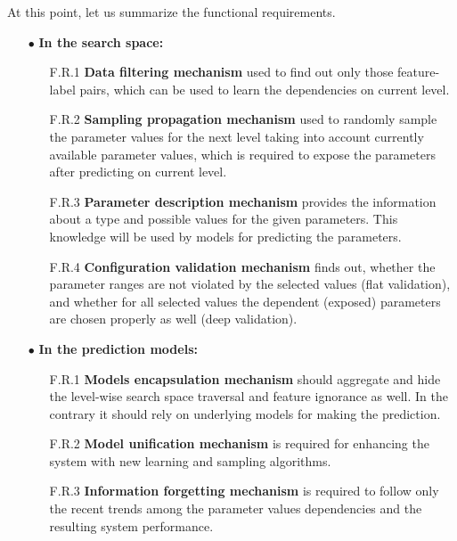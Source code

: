 At this point, let us summarize the functional requirements.
\begin{itemize}
	\item[$\bullet$] \textbf{In the search space:}
	\begin{enumerate}
		\item[F.R.1] \textbf{Data filtering mechanism} used to find out only those feature-label pairs, which can be used to learn the dependencies on current level.
		
		\item[F.R.2] \textbf{Sampling propagation mechanism} used to randomly sample the parameter values for  the next level taking into account currently available parameter values, which is required to expose the parameters after predicting on current level.
		
		\item[F.R.3] \textbf{Parameter description mechanism} provides the information about a type and possible values for the given parameters. This knowledge will be used by models for predicting the parameters.
		
		\item[F.R.4] \textbf{Configuration validation mechanism} finds out, whether the parameter ranges are not violated by the selected values (flat validation), and whether for all selected values the dependent (exposed) parameters are chosen properly as well (deep validation).
	\end{enumerate}

	\item[$\bullet$] \textbf{In the prediction models:}
	\begin{enumerate}
		\item[F.R.1] \textbf{Models encapsulation mechanism} should aggregate and hide the level-wise search space traversal and feature ignorance as well. In the contrary it should rely on underlying models for making the prediction.
		
		\item[F.R.2] \textbf{Model unification mechanism} is required for enhancing the system with new learning and sampling algorithms.
		
		\item[F.R.3] \textbf{Information forgetting mechanism} is required to follow only the recent trends among the parameter values dependencies and the resulting system performance.
	\end{enumerate}
\end{itemize}


